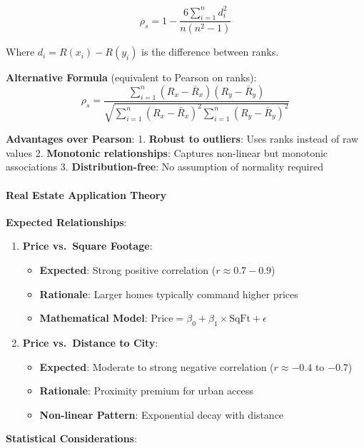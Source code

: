 \documentclass[11pt]{article}
\providecommand{\tightlist}{%
      \setlength{\itemsep}{0pt}\setlength{\parskip}{0pt}}
\begin{document}
\[\rho_s = 1 - \frac{6\sum_{i=1}^{n}d_i^2}{n(n^2-1)}\]

Where \(d_i = R(x_i) - R(y_i)\) is the difference between ranks.

\textbf{Alternative Formula} (equivalent to Pearson on ranks):
\[\rho_s = \frac{\sum_{i=1}^{n}(R_x - \bar{R}_x)(R_y - \bar{R}_y)}{\sqrt{\sum_{i=1}^{n}(R_x - \bar{R}_x)^2 \sum_{i=1}^{n}(R_y - \bar{R}_y)^2}}\]

\textbf{Advantages over Pearson}: 1. \textbf{Robust to outliers}: Uses
ranks instead of raw values 2. \textbf{Monotonic relationships}:
Captures non-linear but monotonic associations 3.
\textbf{Distribution-free}: No assumption of normality required

\paragraph{Real Estate Application
Theory}\label{real-estate-application-theory}

\textbf{Expected Relationships}:

\begin{enumerate}
\def\labelenumi{\arabic{enumi}.}
\tightlist
\item
  \textbf{Price vs.~Square Footage}:

  \begin{itemize}
  \tightlist
  \item
    \textbf{Expected}: Strong positive correlation
    (\(r \approx 0.7-0.9\))
  \item
    \textbf{Rationale}: Larger homes typically command higher prices
  \item
    \textbf{Mathematical Model}:
    \(\text{Price} = \beta_0 + \beta_1 \times \text{SqFt} + \epsilon\)
  \end{itemize}
\item
  \textbf{Price vs.~Distance to City}:

  \begin{itemize}
  \tightlist
  \item
    \textbf{Expected}: Moderate to strong negative correlation
    (\(r \approx -0.4\) to \(-0.7\))
  \item
    \textbf{Rationale}: Proximity premium for urban access
  \item
    \textbf{Non-linear Pattern}: Exponential decay with distance
  \end{itemize}
\end{enumerate}

\textbf{Statistical Considerations}:
\end{document}
